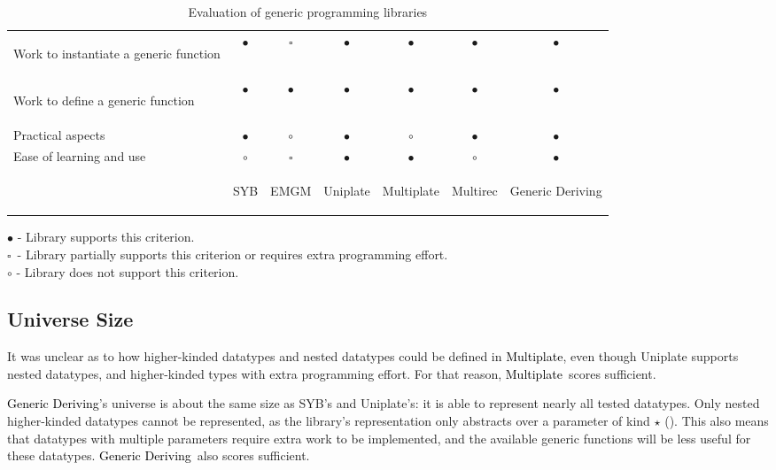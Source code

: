 \documentclass[twocolumn,11pt,a4paper]{article}
\newcommand{\multiplate}{\textcolor{black}{Multiplate}}
\newcommand{\genericderiving}{\textcolor{black}{Generic Deriving}}
\newcommand{\sufficient}{\tiny{$ \square $}}
\begin{document}
\begin{table*}[ht]
\begin{tabular}{l | c c c c c c}
\begin{small}
Work to instantiate a generic function
\end{small} & $ \bullet $ & \sufficient & $ \bullet $ & $ \bullet $ & $ \bullet $ & $ \bullet $ \\
\begin{small}
Work to define a generic function
\end{small} & $ \bullet $ & $ \bullet $ & $ \bullet $ & $ \bullet $ & $ \bullet $ & $ \bullet $ \\
Practical aspects & $ \bullet $ & $ \circ $ & $ \bullet $ & $ \circ $ & $ \bullet $ & $ \bullet $ \\
Ease of learning and use & $ \circ $ & \sufficient & $ \bullet $ & $ \bullet $ & $ \circ $ & $ \bullet $ \\
\hline
& \begin{tiny}
SYB
\end{tiny} & \begin{tiny}
EMGM
\end{tiny} & \begin{tiny}
Uniplate
\end{tiny} & \begin{tiny}
Multiplate
\end{tiny} & \begin{tiny}
Multirec
\end{tiny} & \begin{tiny}
Generic Deriving
\end{tiny} \\
\end{tabular}
\small
$ \bullet $ - Library supports this criterion. \\
\tiny{$\square$}\small\ - Library partially supports this criterion or requires extra programming effort. \\
$ \circ $ - Library does not support this criterion.
\caption{Evaluation of generic programming libraries}
\end{table*}



\subsection{Universe Size}
It was unclear as to how higher-kinded datatypes and nested datatypes could be defined in \multiplate, even though Uniplate supports nested datatypes, and higher-kinded types with extra programming effort.
For that reason, \multiplate\ scores sufficient.

\genericderiving's universe is about the same size as SYB's and Uniplate's: it is able to represent nearly all tested datatypes.
Only nested higher-kinded datatypes cannot be represented, as the library's representation only abstracts over a parameter of kind $ \star $ (\citet{generic-deriving:2010:lib}).
This also means that datatypes with multiple parameters require extra work to be implemented, and the available generic functions will be less useful for these datatypes.
\genericderiving\ also scores sufficient.
\end{document}
